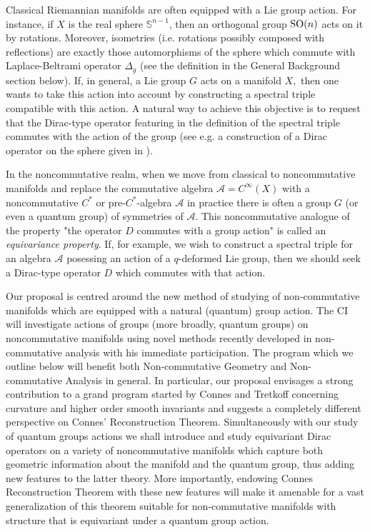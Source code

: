 \documentclass[12pt]{article}
\begin{document}
Classical Riemannian manifolds are often equipped with a Lie group action. For instance, if $X$ is the real sphere $\mathbb{S}^{n-1}$, then an orthogonal group ${\rm SO}(n)$ acts on it by rotations. Moreover, isometries (i.e. rotations possibly composed with reflections) are exactly those automorphisms of the sphere which commute with Laplace-Beltrami operator $\Delta_g$ (see the definition in the General Background section below). If, in general, a Lie group $G$ acts on a manifold $X,$ then one wants to take this action into account by constructing a spectral triple compatible with this action. A natural way to achieve this objective is to request that the Dirac-type operator featuring in the definition of the spectral triple commutes with the action of the group (see e.g. a construction of a Dirac operator on the sphere given in \cite{GVF}). 

In the noncommutative realm, when we move from classical to noncommutative manifolds and replace the commutative algebra $\mathcal{A}=C^{\infty}(X)$ with a noncommutative $C^*$ or pre-$C^*$-algebra $\mathcal{A}$ in practice there is often a group $G$ (or even a quantum group) of symmetries of $\mathcal{A}.$ This noncommutative analogue of the property "the operator $D$ commutes with a group action" is called an {\it equivariance property}. If, for example, we wish to construct a spectral triple for an algebra $\mathcal{A}$ posessing an action of a $q$-deformed Lie group, then we should seek a Dirac-type operator $D$ which commutes with that action.



Our proposal is centred around the new method of studying of non-commutative manifolds which are equipped with a natural (quantum) group action. The CI will investigate actions of groups (more broadly, quantum groups) on noncommutative manifolds using novel methods recently developed in non-commutative analysis with his immediate participation. The program which we outline below will benefit both Non-commutative Geometry and Non-commutative Analysis in general. In particular, our proposal envisages a strong contribution to a grand program started by Connes and Tretkoff \cite{ConnesTretkoff} concerning curvature and higher order smooth invariants and suggests a completely different perspective on Connes' Reconstruction Theorem. Simultaneously with our study of quantum groups actions we shall introduce and study equivariant Dirac operators on a variety of noncommutative manifolds which capture both geometric information about the manifold and the quantum group, thus adding new features to the latter theory. More importantly, endowing Connes Reconstruction Theorem with these new features will make it amenable for a vast generalization of this theorem suitable for non-commutative manifolds with structure that is equivariant under a quantum group action.
\end{document}
